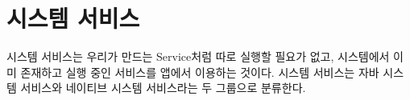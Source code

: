 \chapter{시스템 서비스}
시스템 서비스는 우리가 만드는 Service처럼 따로 실행할 필요가 없고, 시스템에서 이미 존재하고 실행 중인 서비스를 앱에서 이용하는 것이다.
시스템 서비스는 자바 시스템 서비스와 네이티브 시스템 서비스라는 두 그룹으로 분류한다.\\

